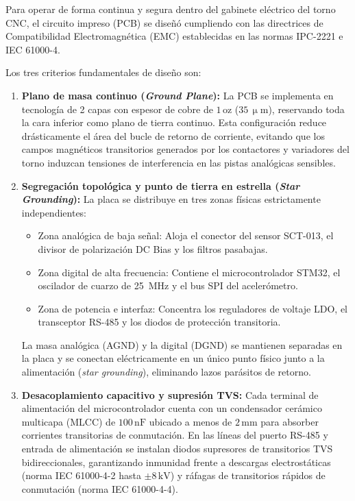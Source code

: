 Para operar de forma continua y segura dentro del gabinete eléctrico del torno CNC, el circuito impreso (PCB) se diseñó cumpliendo con las directrices de Compatibilidad Electromagnética (EMC) establecidas en las normas IPC-2221 e IEC 61000-4.

Los tres criterios fundamentales de diseño son:
\begin{enumerate}
    \item \textbf{Plano de masa continuo (\textit{Ground Plane}):} La PCB se implementa en tecnología de 2 capas con espesor de cobre de $1\,\text{oz}$ ($35\,\upmu\text{m}$), reservando toda la cara inferior como plano de tierra continuo. Esta configuración reduce drásticamente el área del bucle de retorno de corriente, evitando que los campos magnéticos transitorios generados por los contactores y variadores del torno induzcan tensiones de interferencia en las pistas analógicas sensibles.
    \item \textbf{Segregación topológica y punto de tierra en estrella (\textit{Star Grounding}):} La placa se distribuye en tres zonas físicas estrictamente independientes:
    \begin{itemize}
        \item Zona analógica de baja señal: Aloja el conector del sensor SCT-013, el divisor de polarización DC Bias y los filtros pasabajas.
        \item Zona digital de alta frecuencia: Contiene el microcontrolador STM32, el oscilador de cuarzo de 25~MHz y el bus SPI del acelerómetro.
        \item Zona de potencia e interfaz: Concentra los reguladores de voltaje LDO, el transceptor RS-485 y los diodos de protección transitoria.
    \end{itemize}
    La masa analógica (AGND) y la digital (DGND) se mantienen separadas en la placa y se conectan eléctricamente en un único punto físico junto a la alimentación (\textit{star grounding}), eliminando lazos parásitos de retorno.
    \item \textbf{Desacoplamiento capacitivo y supresión TVS:} Cada terminal de alimentación del microcontrolador cuenta con un condensador cerámico multicapa (MLCC) de $100\,\text{nF}$ ubicado a menos de $2\,\text{mm}$ para absorber corrientes transitorias de conmutación. En las líneas del puerto RS-485 y entrada de alimentación se instalan diodos supresores de transitorios TVS bidireccionales, garantizando inmunidad frente a descargas electrostáticas (norma IEC 61000-4-2 hasta $\pm 8\,\text{kV}$) y ráfagas de transitorios rápidos de conmutación (norma IEC 61000-4-4).
\end{enumerate}


